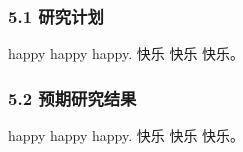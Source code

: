 
\subsubsection{5.1 研究计划}

happy happy happy.
快乐 快乐 快乐。

\subsubsection{5.2 预期研究结果}

happy happy happy.
快乐 快乐 快乐。